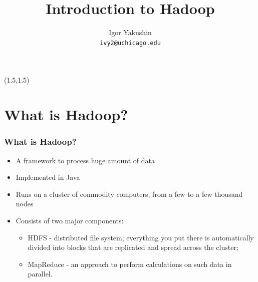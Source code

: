 \documentclass{beamer}
\title{\huge{Introduction to Hadoop}}
\author{Igor Yakushin \\ \texttt{ivy2@uchicago.edu}}
\newcommand{\RCCLogo}{
\begin{textblock}{14}(1.5,1.5)
  \pgfuseimage{logo_rcc}
\end{textblock}
}
\begin{document}



\begin{frame}
\RCCLogo
\titlepage
\end{frame}


%

\section{What is Hadoop?}
\begin{frame}
  \frametitle{What is Hadoop?}
  \begin{itemize}
   \item A framework to process huge amount of data
   \item Implemented in Java
   \item Runs on a cluster of commodity computers, from a few to a few thousand nodes
   \item Consists of two major components:
    \begin{itemize}
      \item {\color{mycolordef}HDFS} - distributed file system; everything you put there is automatically divided into blocks that are replicated and spread across the cluster;
      \item {\color{mycolordef}MapReduce} - an approach to perform calculations on such data in parallel.
    \end{itemize}
  \end{itemize}
\end{frame}
\end{document}
